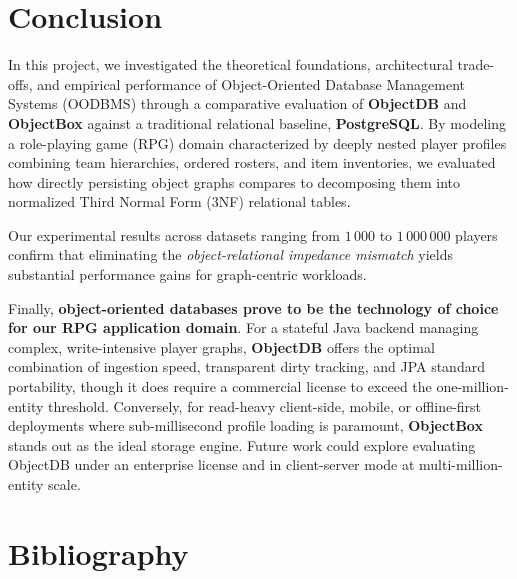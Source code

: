 \documentclass{article}
\begin{document}
\section{Conclusion}
In this project, we investigated the theoretical foundations, architectural trade-offs, and empirical performance of Object-Oriented Database Management Systems (OODBMS) through a comparative evaluation of \textbf{ObjectDB} and \textbf{ObjectBox} against a traditional relational baseline, \textbf{PostgreSQL}. By modeling a role-playing game (RPG) domain characterized by deeply nested player profiles combining team hierarchies, ordered rosters, and item inventories, we evaluated how directly persisting object graphs compares to decomposing them into normalized Third Normal Form (3NF) relational tables.

Our experimental results across datasets ranging from $1\,000$ to $1\,000\,000$ players confirm that eliminating the \emph{object-relational impedance mismatch} yields substantial performance gains for graph-centric workloads.

Finally, \textbf{object-oriented databases prove to be the technology of choice for our RPG application domain}. For a stateful Java backend managing complex, write-intensive player graphs, \textbf{ObjectDB} offers the optimal combination of ingestion speed, transparent dirty tracking, and JPA standard portability, though it does require a commercial license to exceed the one-million-entity threshold. Conversely, for read-heavy client-side, mobile, or offline-first deployments where sub-millisecond profile loading is paramount, \textbf{ObjectBox} stands out as the ideal storage engine. Future work could explore evaluating ObjectDB under an enterprise license and in client-server mode at multi-million-entity scale.

\section{Bibliography}
\end{document}
